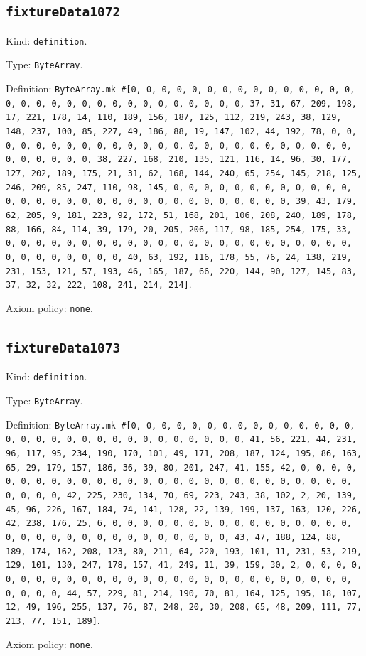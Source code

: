 \documentclass[11pt]{article}
\begin{document}
\subsection*{\texttt{fixtureData1072}}
\noindent Kind: \texttt{definition}.\par
\noindent Type: \texttt{ByteArray}.\par
\noindent Definition: \texttt{ByteArray.mk \#[0, 0, 0, 0, 0, 0, 0, 0, 0, 0, 0, 0, 0, 0, 0, 0, 0, 0, 0, 0, 0, 0, 0, 0, 0, 0, 0, 0, 0, 0, 0, 37, 31, 67, 209, 198, 17, 221, 178, 14, 110, 189, 156, 187, 125, 112, 219, 243, 38, 129, 148, 237, 100, 85, 227, 49, 186, 88, 19, 147, 102, 44, 192, 78, 0, 0, 0, 0, 0, 0, 0, 0, 0, 0, 0, 0, 0, 0, 0, 0, 0, 0, 0, 0, 0, 0, 0, 0, 0, 0, 0, 0, 0, 0, 0, 38, 227, 168, 210, 135, 121, 116, 14, 96, 30, 177, 127, 202, 189, 175, 21, 31, 62, 168, 144, 240, 65, 254, 145, 218, 125, 246, 209, 85, 247, 110, 98, 145, 0, 0, 0, 0, 0, 0, 0, 0, 0, 0, 0, 0, 0, 0, 0, 0, 0, 0, 0, 0, 0, 0, 0, 0, 0, 0, 0, 0, 0, 0, 0, 39, 43, 179, 62, 205, 9, 181, 223, 92, 172, 51, 168, 201, 106, 208, 240, 189, 178, 88, 166, 84, 114, 39, 179, 20, 205, 206, 117, 98, 185, 254, 175, 33, 0, 0, 0, 0, 0, 0, 0, 0, 0, 0, 0, 0, 0, 0, 0, 0, 0, 0, 0, 0, 0, 0, 0, 0, 0, 0, 0, 0, 0, 0, 0, 40, 63, 192, 116, 178, 55, 76, 24, 138, 219, 231, 153, 121, 57, 193, 46, 165, 187, 66, 220, 144, 90, 127, 145, 83, 37, 32, 32, 222, 108, 241, 214, 214]}.\par
\noindent Axiom policy: \texttt{none}.\par
\subsection*{\texttt{fixtureData1073}}
\noindent Kind: \texttt{definition}.\par
\noindent Type: \texttt{ByteArray}.\par
\noindent Definition: \texttt{ByteArray.mk \#[0, 0, 0, 0, 0, 0, 0, 0, 0, 0, 0, 0, 0, 0, 0, 0, 0, 0, 0, 0, 0, 0, 0, 0, 0, 0, 0, 0, 0, 0, 0, 41, 56, 221, 44, 231, 96, 117, 95, 234, 190, 170, 101, 49, 171, 208, 187, 124, 195, 86, 163, 65, 29, 179, 157, 186, 36, 39, 80, 201, 247, 41, 155, 42, 0, 0, 0, 0, 0, 0, 0, 0, 0, 0, 0, 0, 0, 0, 0, 0, 0, 0, 0, 0, 0, 0, 0, 0, 0, 0, 0, 0, 0, 0, 0, 42, 225, 230, 134, 70, 69, 223, 243, 38, 102, 2, 20, 139, 45, 96, 226, 167, 184, 74, 141, 128, 22, 139, 199, 137, 163, 120, 226, 42, 238, 176, 25, 6, 0, 0, 0, 0, 0, 0, 0, 0, 0, 0, 0, 0, 0, 0, 0, 0, 0, 0, 0, 0, 0, 0, 0, 0, 0, 0, 0, 0, 0, 0, 0, 43, 47, 188, 124, 88, 189, 174, 162, 208, 123, 80, 211, 64, 220, 193, 101, 11, 231, 53, 219, 129, 101, 130, 247, 178, 157, 41, 249, 11, 39, 159, 30, 2, 0, 0, 0, 0, 0, 0, 0, 0, 0, 0, 0, 0, 0, 0, 0, 0, 0, 0, 0, 0, 0, 0, 0, 0, 0, 0, 0, 0, 0, 0, 0, 44, 57, 229, 81, 214, 190, 70, 81, 164, 125, 195, 18, 107, 12, 49, 196, 255, 137, 76, 87, 248, 20, 30, 208, 65, 48, 209, 111, 77, 213, 77, 151, 189]}.\par
\noindent Axiom policy: \texttt{none}.\par
\end{document}
